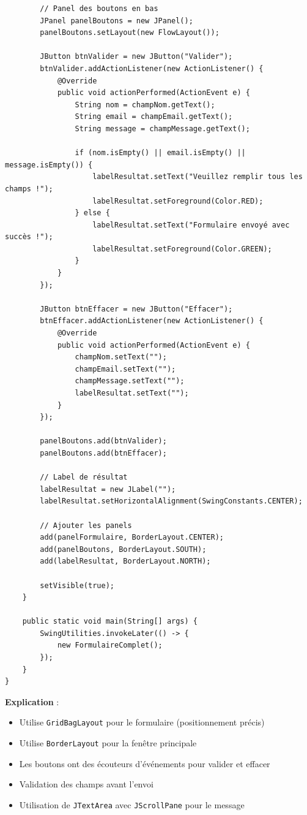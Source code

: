 \documentclass[11pt,a4paper]{article}
\begin{document}
\begin{lstlisting}
        // Panel des boutons en bas
        JPanel panelBoutons = new JPanel();
        panelBoutons.setLayout(new FlowLayout());
        
        JButton btnValider = new JButton("Valider");
        btnValider.addActionListener(new ActionListener() {
            @Override
            public void actionPerformed(ActionEvent e) {
                String nom = champNom.getText();
                String email = champEmail.getText();
                String message = champMessage.getText();
                
                if (nom.isEmpty() || email.isEmpty() || message.isEmpty()) {
                    labelResultat.setText("Veuillez remplir tous les champs !");
                    labelResultat.setForeground(Color.RED);
                } else {
                    labelResultat.setText("Formulaire envoyé avec succès !");
                    labelResultat.setForeground(Color.GREEN);
                }
            }
        });
        
        JButton btnEffacer = new JButton("Effacer");
        btnEffacer.addActionListener(new ActionListener() {
            @Override
            public void actionPerformed(ActionEvent e) {
                champNom.setText("");
                champEmail.setText("");
                champMessage.setText("");
                labelResultat.setText("");
            }
        });
        
        panelBoutons.add(btnValider);
        panelBoutons.add(btnEffacer);
        
        // Label de résultat
        labelResultat = new JLabel("");
        labelResultat.setHorizontalAlignment(SwingConstants.CENTER);
        
        // Ajouter les panels
        add(panelFormulaire, BorderLayout.CENTER);
        add(panelBoutons, BorderLayout.SOUTH);
        add(labelResultat, BorderLayout.NORTH);
        
        setVisible(true);
    }
    
    public static void main(String[] args) {
        SwingUtilities.invokeLater(() -> {
            new FormulaireComplet();
        });
    }
}
\end{lstlisting}

\textbf{Explication} :
\begin{itemize}
    \item Utilise \texttt{GridBagLayout} pour le formulaire (positionnement précis)
    \item Utilise \texttt{BorderLayout} pour la fenêtre principale
    \item Les boutons ont des écouteurs d'événements pour valider et effacer
    \item Validation des champs avant l'envoi
    \item Utilisation de \texttt{JTextArea} avec \texttt{JScrollPane} pour le message
\end{itemize}
\end{document}
